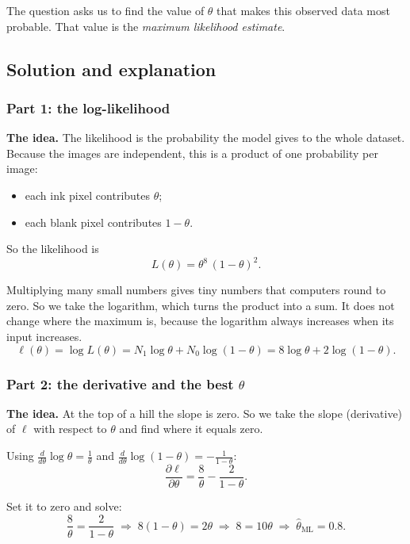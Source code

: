 \documentclass[12pt,a4paper]{article}
\begin{document}
The question asks us to find the value of $\theta$ that makes this observed data most probable. That value is the \emph{maximum likelihood estimate}.

\subsection{Solution and explanation}

\subsubsection{Part 1: the log-likelihood}

\textbf{The idea.} The likelihood is the probability the model gives to the whole dataset. Because the images are independent, this is a product of one probability per image:
\begin{itemize}[leftmargin=*]
\item each ink pixel contributes $\theta$;
\item each blank pixel contributes $1 - \theta$.
\end{itemize}

So the likelihood is
\[
L(\theta) = \theta^{8}\,(1-\theta)^{2}.
\]

Multiplying many small numbers gives tiny numbers that computers round to zero. So we take the logarithm, which turns the product into a sum. It does not change where the maximum is, because the logarithm always increases when its input increases.
\[
\ell(\theta) = \log L(\theta) = N_1 \log\theta + N_0 \log(1-\theta) = 8\log\theta + 2\log(1-\theta).
\]

\subsubsection{Part 2: the derivative and the best $\theta$}

\textbf{The idea.} At the top of a hill the slope is zero. So we take the slope (derivative) of $\ell$ with respect to $\theta$ and find where it equals zero.

Using $\frac{d}{d\theta}\log\theta = \frac{1}{\theta}$ and $\frac{d}{d\theta}\log(1-\theta) = -\frac{1}{1-\theta}$:
\[
\frac{\partial \ell}{\partial \theta} = \frac{8}{\theta} - \frac{2}{1-\theta}.
\]

Set it to zero and solve:
\[
\frac{8}{\theta} = \frac{2}{1-\theta}
\;\Longrightarrow\; 8(1-\theta) = 2\theta
\;\Longrightarrow\; 8 = 10\theta
\;\Longrightarrow\; \hat{\theta}_{\mathrm{ML}} = 0.8 .
\]
\end{document}
